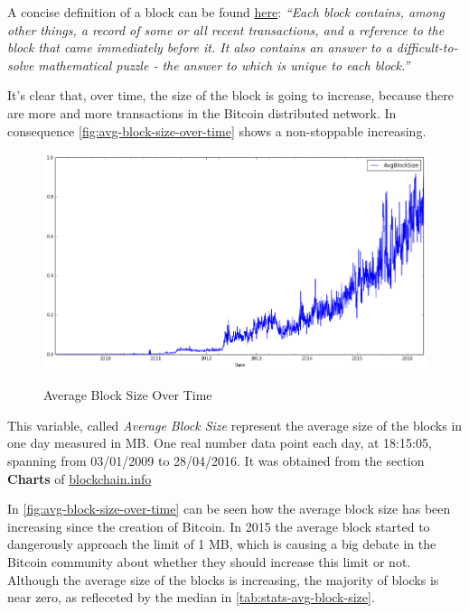 A concise definition of a block can be found
\href{https://en.bitcoin.it/wiki/Block}{here}: \textit{``Each block
  contains, among other things, a record of some or all recent
  transactions, and a reference to the block that came immediately
  before it. It also contains an answer to a difficult-to-solve
  mathematical puzzle - the answer to which is unique to each
  block.''}

It's clear that, over time, the size of the block is going to
increase, because there are more and more transactions in the Bitcoin
distributed network. In consequence
\autoref{fig:avg-block-size-over-time} shows a non-stoppable
increasing.

\begin{figure}[bth]
  \myfloatalign
  {\includegraphics[width=1\linewidth]
    {gfx/avg-block-size-over-time}} 
  \caption{Average Block Size Over Time}
  \label{fig:avg-block-size-over-time}
\end{figure}

This variable, called \textit{Average Block Size} represent the
average size of the blocks in one day measured in MB. One real number
data point each day, at 18:15:05, spanning from 03/01/2009 to
28/04/2016. It was obtained from the section \textbf{Charts} of
\href{blockchain.info}{blockchain.info}


In \autoref{fig:avg-block-size-over-time} can be seen how the average
block size has been increasing since the creation of Bitcoin. In 2015
the average block started to dangerously approach the limit of 1 MB,
which is causing a big debate in the Bitcoin community about whether
they should increase this limit or not. Although the average size of
the blocks is increasing, the majority of blocks is near zero, as
refleceted by the median in \autoref{tab:stats-avg-block-size}.

